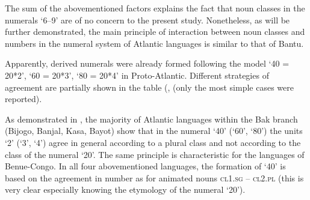 The sum of the abovementioned factors explains the fact that noun classes in the numerals ‘6--9’ are of no concern to the present study. Nonetheless, as will be further demonstrated, the main principle of interaction between noun classes and numbers in the numeral system of Atlantic languages is similar to that of Bantu. 

Apparently, derived numerals were already formed following the model ‘40 = 20*2’, ‘60 = 20*3’, ‘80 = 20*4’ in Proto-Atlantic. Different strategies of agreement are partially shown in the table (, (only the most simple cases were reported).

\begin{table}

\caption{\label{tab:1:12} Atlantic languages: noun classes in the derived numerals}

\end{table}


As demonstrated in , the majority of Atlantic languages within the Bak branch (Bijogo, Banjal, Kasa, Bayot) show that in the numeral ‘40’ (‘60’, ‘80’) the units ‘2’ (‘3’, ‘4’) agree in general according to a plural class and not according to the class of the numeral ‘20’. The same principle is characteristic for the languages of Benue-Congo. In all four abovementioned languages, the formation of ‘40’ is based on the agreement in number as for animated nouns  \textsc{cl}1.\textsc{sg} – \textsc{cl}2.\textsc{pl} (this is very clear especially knowing the etymology of the numeral `20'). 

